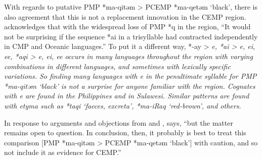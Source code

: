 With regards to putative PMP *ma-qitəm > PCEMP *ma-qetəm ‘black’,
there is also agreement that this is not a replacement innovation
in the CEMP region.
\citet[248]{Blust1993} acknowledges that with the widespread
loss of PMP *q in the region,
“It would not be surprising if the sequence *ai in a trisyllable
had contracted independently in CMP
and Oceanic languages.” 
To put it a different way,
*-ay > \it{e}, *ai \it{> e,
ei, ee}, *aqi > \it{e, ei,
ee} occurs in many languages throughout the region with varying
combinations in different languages,
and sometimes with lexically specific variations.
So finding many languages with \it{e} in the penultimate syllable
for PMP *ma-qitəm ‘black’ is not a surprise for anyone familiar with the region.
Cognates with \it{e} are found in the Philippines and in Sulawesi.
Similar patterns are found with etyma such as *taqi ‘faeces,
excreta’, *ma-iRaq ‘red-brown’, and others.

In response to arguments
and objections from \citet{Nothofer1992}
and \citet{DonohueGrimes2008}, \citet[56]{Blust2009} says,
“but the matter remains open to question.
In conclusion, then, it probably is best to treat this comparison
[PMP *ma-qitəm > PCEMP *ma-qetəm ‘black’] with caution,
and so not include it as evidence for CEMP.”